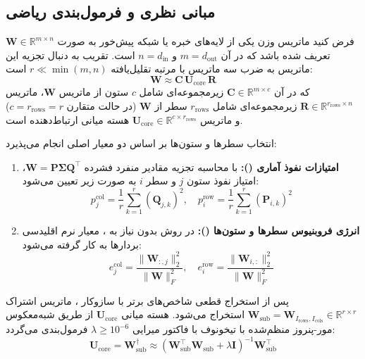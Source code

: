 \subsection{مبانی نظری و فرمول‌بندی ریاضی}
فرض کنید ماتریس وزن یکی از لایه‌های خبره یا شبکه پیش‌خور به صورت $\mathbf{W} \in \mathbb{R}^{m \times n}$ تعریف شده باشد که در آن $m = d_{\text{out}}$ و $n = d_{\text{in}}$ است. تقریب  به دنبال تجزیه این ماتریس به ضرب سه ماتریس با مرتبه تقلیل‌یافته $r \ll \min(m, n)$ است:
\begin{equation}
\mathbf{W} \approx \mathbf{C} \, \mathbf{U}_{\text{core}} \, \mathbf{R}
\end{equation}
که در آن $\mathbf{C} \in \mathbb{R}^{m \times c}$ زیرمجموعه‌ای شامل $c$ ستون از ماتریس $\mathbf{W}$، ماتریس $\mathbf{R} \in \mathbb{R}^{r_{\text{rows}} \times n}$ زیرمجموعه‌ای شامل $r_{\text{rows}}$ سطر از $\mathbf{W}$ (در حالت متقارن $c = r_{\text{rows}} = r$) و ماتریس $\mathbf{U}_{\text{core}} \in \mathbb{R}^{c \times r_{\text{rows}}}$ هسته میانی ارتباط‌دهنده است.

انتخاب سطرها و ستون‌ها بر اساس دو معیار اصلی انجام می‌پذیرد:
\begin{enumerate}
    \item \textbf{امتیازات نفوذ آماری ():} با محاسبه تجزیه مقادیر منفرد فشرده $\mathbf{W} = \mathbf{P} \mathbf{\Sigma} \mathbf{Q}^\top$، امتیاز نفوذ ستون $j$ و سطر $i$ به صورت زیر تعیین می‌شود:
    \begin{equation}
    p_j^{\text{col}} = \frac{1}{r} \sum_{k=1}^r (\mathbf{Q}_{j, k})^2, \quad p_i^{\text{row}} = \frac{1}{r} \sum_{k=1}^r (\mathbf{P}_{i, k})^2
    \end{equation}
    \item \textbf{انرژی فروبنیوس سطرها و ستون‌ها ():} در روش بدون نیاز به ، معیار نرم اقلیدسی بردارها به کار گرفته می‌شود:
    \begin{equation}
    e_j^{\text{col}} = \frac{\|\mathbf{W}_{:, j}\|_2^2}{\|\mathbf{W}\|_F^2}, \quad e_i^{\text{row}} = \frac{\|\mathbf{W}_{i, :}\|_2^2}{\|\mathbf{W}\|_F^2}
    \end{equation}
\end{enumerate}

پس از استخراج قطعی شاخص‌های برتر با سازوکار ، ماتریس اشتراک $\mathbf{W}_{\text{sub}} = \mathbf{W}_{I_{\text{rows}}, I_{\text{cols}}} \in \mathbb{R}^{r \times r}$ استخراج می‌شود. هسته میانی $\mathbf{U}_{\text{core}}$ از طریق شبه‌معکوس مور-پنروز منظم‌شده با تیخونوف با فاکتور میرایی $\lambda \ge 10^{-6}$ فرمول‌بندی می‌گردد:
\begin{equation}
\mathbf{U}_{\text{core}} = \mathbf{W}_{\text{sub}}^\dagger \approx (\mathbf{W}_{\text{sub}}^\top \mathbf{W}_{\text{sub}} + \lambda \mathbf{I})^{-1} \mathbf{W}_{\text{sub}}^\top
\end{equation}

